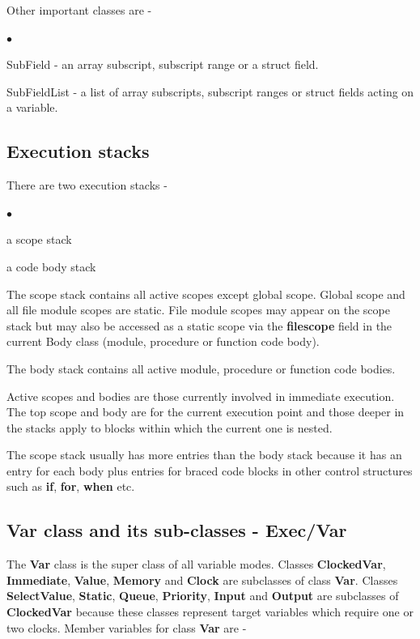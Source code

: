\documentclass[10pt,a4paper,twoside,fleqn]{book}
\newcommand{\blist}{\begin{list}{$\bullet$}{\setlength{\itemsep}{-5pt}\setlength{\topsep}{-5pt}}}
\newcommand{\blend}{\end{list}}
\begin{document}
        Other important classes are -
        \blist
        \item SubField - an array subscript, subscript range or a struct field.
        \item SubFieldList - a list of array subscripts, subscript ranges or struct
                    fields acting on a variable.
        \blend
        

        \subsection{Execution stacks}

            There are two execution stacks -
            \blist
            \item   a scope stack
            \item   a code body stack
            \blend

            The scope stack contains all active scopes except global scope.
            Global scope and all file module scopes are static. File module
            scopes may appear on the scope stack but may also be accessed as a
            static scope via the {\bf filescope} field in the current Body class
            (module, procedure or function code body).

            The body stack contains all active module, procedure or function
            code bodies.

            Active scopes and bodies are those currently involved in immediate
            execution. The top scope and body are for the current execution
            point and those deeper in the stacks apply to blocks within which the
            current one is nested.

            The scope stack usually has more entries than the body stack because
            it has an entry for each body plus entries for braced code blocks
            in other control structures such as {\bf if}, {\bf for}, {\bf when} etc.
    

        \subsection{Var class and its sub-classes - Exec/Var}

            The {\bf Var} class is the super class of all variable modes. Classes
            {\bf ClockedVar}, {\bf Immediate}, {\bf Value}, {\bf Memory} and {\bf
            Clock} are subclasses of class {\bf Var}. Classes {\bf SelectValue},
            {\bf Static}, {\bf Queue}, {\bf Priority}, {\bf Input} and {\bf Output}
            are subclasses of {\bf ClockedVar} because these classes represent
            target variables which require one or two clocks. Member variables
            for class {\bf Var} are -
\end{document}
